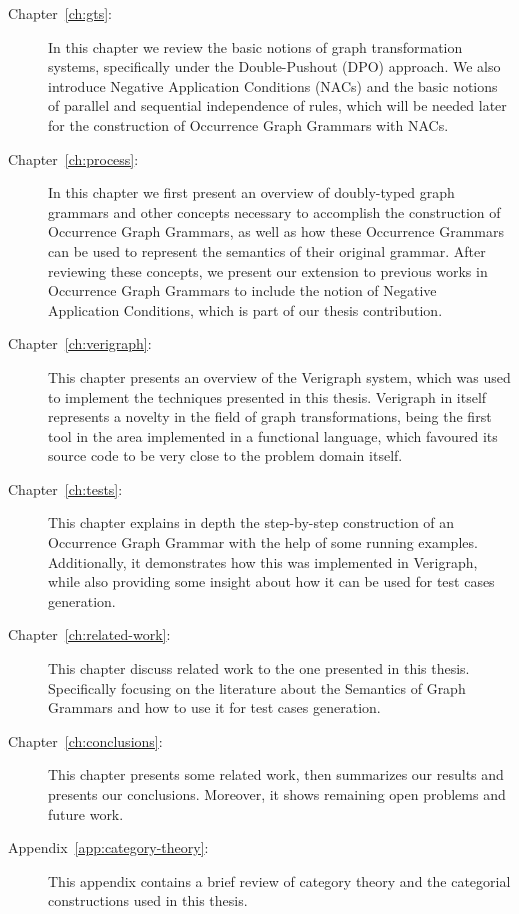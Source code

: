 \begin{description}
	\item[Chapter~\ref{ch:gts}:] In this chapter we review the basic notions of graph transformation systems, specifically under the Double-Pushout (DPO) approach. We also introduce Negative Application Conditions (NACs) and the basic notions of parallel and sequential independence of rules, which will be needed later for the construction of Occurrence Graph Grammars with NACs.

  \item[Chapter~\ref{ch:process}:] In this chapter we first present an overview of doubly-typed graph grammars and other concepts necessary to accomplish the construction of Occurrence Graph Grammars, as well as how these Occurrence Grammars can be used to represent the semantics of their original grammar. After reviewing these concepts, we present our extension to previous works in Occurrence Graph Grammars to include the notion of Negative Application Conditions, which is part of our thesis contribution.

  \item[Chapter~\ref{ch:verigraph}:] This chapter presents an overview of the Verigraph system, which was used to implement the techniques presented in this thesis. Verigraph in itself represents a novelty in the field of graph transformations, being the first tool in the area implemented in a functional language, which favoured its source code to be very close to the problem domain itself.

  \item[Chapter~\ref{ch:tests}:] This chapter explains in depth the step-by-step construction of an Occurrence Graph Grammar with the help of some running examples. Additionally, it demonstrates how this was implemented in Verigraph, while also providing some insight about how it can be used for test cases generation.

  \item[Chapter~\ref{ch:related-work}:] This chapter discuss related work to the one presented in this thesis. Specifically focusing on the literature about the Semantics of Graph Grammars and how to use it for test cases generation.

  \item[Chapter~\ref{ch:conclusions}:] This chapter presents some related work, then summarizes our results and presents our conclusions. Moreover, it shows remaining open problems and future work.

  \item[Appendix~\ref{app:category-theory}:] This appendix contains a brief review of category theory and the categorial constructions used in this thesis.

\end{description}

